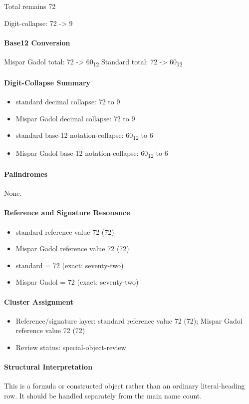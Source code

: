 Total remains 72

Digit-collapse: 72 -> 9
\paragraph{Base12 Conversion}
Mispar Gadol total: 72 -> 60\textsubscript{12}
Standard total: 72 -> 60\textsubscript{12}
\paragraph{Digit-Collapse Summary}
\begin{itemize}
\item standard decimal collapse: 72 to 9
\item Mispar Gadol decimal collapse: 72 to 9
\item standard base-12 notation-collapse: 60\textsubscript{12} to 6
\item Mispar Gadol base-12 notation-collapse: 60\textsubscript{12} to 6
\end{itemize}
\paragraph{Palindromes}
None.
\paragraph{Reference and Signature Resonance}
\begin{itemize}
\item standard reference value 72 (72)
\item Mispar Gadol reference value 72 (72)
\item standard = 72 (exact: seventy-two)
\item Mispar Gadol = 72 (exact: seventy-two)
\end{itemize}
\paragraph{Cluster Assignment}
\begin{itemize}
\item Reference/signature layer: standard reference value 72 (72); Mispar Gadol reference value 72 (72)
\item Review status: special-object-review
\end{itemize}
\paragraph{Structural Interpretation}
This is a formula or constructed object rather than an ordinary literal-heading row. It should be handled separately from the main name count.

